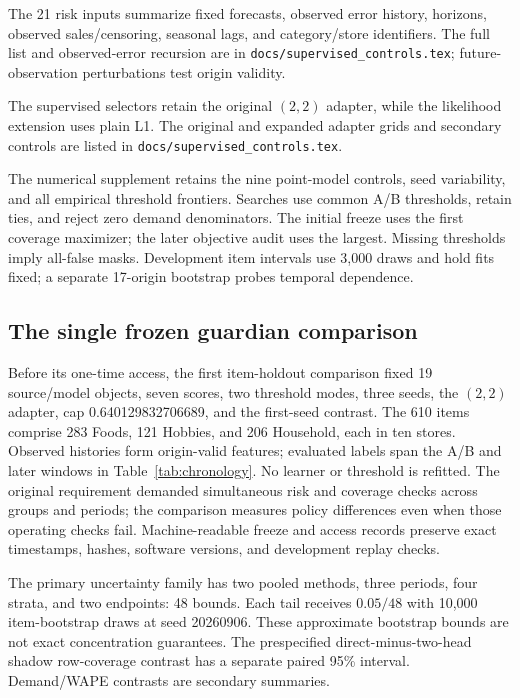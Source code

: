 The 21 risk inputs summarize fixed forecasts, observed error history, horizons, observed sales/censoring, seasonal lags, and category/store identifiers. The full list and observed-error recursion are in \texttt{docs/supervised\_controls.tex}; future-observation perturbations test origin validity.

The supervised selectors retain the original $(2,2)$ adapter, while the likelihood extension uses plain L1. The original and expanded adapter grids and secondary controls are listed in \texttt{docs/supervised\_controls.tex}.

The numerical supplement retains the nine point-model controls, seed variability, and all empirical threshold frontiers. Searches use common A/B thresholds, retain ties, and reject zero demand denominators. The initial freeze uses the first coverage maximizer; the later objective audit uses the largest. Missing thresholds imply all-false masks. Development item intervals use 3,000 draws and hold fits fixed; a separate 17-origin bootstrap probes temporal dependence.
\subsection{The single frozen guardian comparison}
\label{app:heldout}\label{app:revision}
Before its one-time access, the first item-holdout comparison fixed 19 source/model objects, seven scores, two threshold modes, three seeds, the $(2,2)$ adapter, cap 0.640129832706689, and the first-seed contrast. The 610 items comprise 283 Foods, 121 Hobbies, and 206 Household, each in ten stores. Observed histories form origin-valid features; evaluated labels span the A/B and later windows in Table~\ref{tab:chronology}. No learner or threshold is refitted. The original requirement demanded simultaneous risk and coverage checks across groups and periods; the comparison measures policy differences even when those operating checks fail. Machine-readable freeze and access records preserve exact timestamps, hashes, software versions, and development replay checks.

The primary uncertainty family has two pooled methods, three periods, four strata, and two endpoints: 48 bounds. Each tail receives $0.05/48$ with 10,000 item-bootstrap draws at seed 20260906. These approximate bootstrap bounds are not exact concentration guarantees. The prespecified direct-minus-two-head shadow row-coverage contrast has a separate paired 95\% interval. Demand/WAPE contrasts are secondary summaries.

